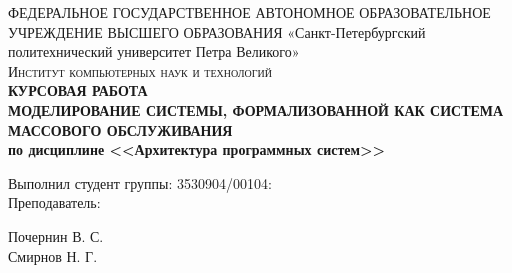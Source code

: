 \documentclass[a4paper, 14pt]{article}
\begin{document}

\begin{titlepage}
	\center

	ФЕДЕРАЛЬНОЕ ГОСУДАРСТВЕННОЕ АВТОНОМНОЕ ОБРАЗОВАТЕЛЬНОЕ УЧРЕЖДЕНИЕ ВЫСШЕГО ОБРАЗОВАНИЯ\linebreak
	«Санкт-Петербургский политехнический университет Петра Великого»\\[2cm]
	\textsc{\Large Институт компьютерных наук и технологий}\\[6.5cm]

	{ \huge \bfseries КУРСОВАЯ РАБОТА	\\
	\Large \mdseries МОДЕЛИРОВАНИЕ СИСТЕМЫ, ФОРМАЛИЗОВАННОЙ КАК СИСТЕМА МАССОВОГО ОБСЛУЖИВАНИЯ \\
	\large по дисциплине <<Архитектура программных систем>>}\\[6.5cm]


	\begin{multicols}{2}
		\begin{flushright} \large

			{Выполнил студент группы: 3530904/00104:}\\[0.5cm]

			{Преподаватель:\\}

		\end{flushright}
		\begin{flushright}

			{Почернин В. С.}\\[0.5cm]


			Смирнов Н. Г.

		\end{flushright}
	\end{multicols}

	\flushright{
		{\today}\\[0.5cm]
	}

	\vfill
\end{titlepage}
\end{document}
